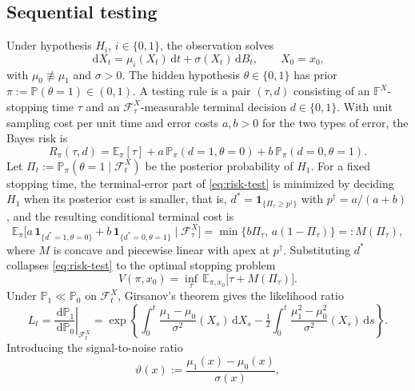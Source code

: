 \documentclass[pdflatex,sn-mathphys-num]{sn-jnl}
\theoremstyle{plain}
\theoremstyle{definition}
\newcommand{\E}{\mathbb{E}}
\newcommand{\PR}{\mathbb{P}}
\newcommand{\Filt}{\mathbb{F}}
\newcommand{\Fx}{\mathcal{F}}
\newcommand{\ind}{\mathbf{1}}
\newcommand{\dd}{\,\mathrm{d}}
\newcommand{\snr}{\vartheta}
\newcommand{\post}{\Pi}
\begin{document}
\subsection{Sequential testing}\label{sec:test}
Under hypothesis $H_i$, $i\in\{0,1\}$, the observation solves
\begin{equation}\label{eq:Xdyn}
  \dd X_t=\mu_i(X_t)\dd t+\sigma(X_t)\dd B_t,\qquad X_0=x_0,
\end{equation}
with $\mu_0\not\equiv\mu_1$ and $\sigma>0$. The hidden hypothesis
$\theta\in\{0,1\}$ has prior $\pi:=\PR(\theta=1)\in(0,1)$. A testing rule is a
pair $(\tau,d)$ consisting of an $\Filt^X$-stopping time $\tau$ and an
$\Fx^X_\tau$-measurable terminal decision $d\in\{0,1\}$. With unit sampling cost
per unit time and error costs $a,b>0$ for the two types of error, the Bayes risk
is
\begin{equation}\label{eq:risk-test}
  R_\pi(\tau,d)=\E_\pi[\tau]
   +a\,\PR_\pi(d=1,\theta=0)+b\,\PR_\pi(d=0,\theta=1).
\end{equation}
Let $\post_t:=\PR_\pi(\theta=1\mid\Fx^X_t)$ be the posterior probability of $H_1$.
For a fixed stopping time, the terminal-error part of \eqref{eq:risk-test} is
minimized by deciding $H_1$ when its posterior cost is smaller, that is,
$d^\ast=\ind_{\{\post_\tau\ge p^\dagger\}}$ with $p^\dagger=a/(a+b)$, and the
resulting conditional terminal cost is
\begin{equation}\label{eq:Mdef}
  \E_\pi\!\big[a\,\ind_{\{d^\ast=1,\theta=0\}}+b\,\ind_{\{d^\ast=0,\theta=1\}}\mid\Fx^X_\tau\big]
   =\min\{b\post_\tau,\,a(1-\post_\tau)\}=:M(\post_\tau),
\end{equation}
where $M$ is concave and piecewise linear with apex at $p^\dagger$. Substituting
$d^\ast$ collapses \eqref{eq:risk-test} to the optimal stopping problem
\begin{equation}\label{eq:value-test}
  V(\pi,x_0)=\inf_\tau\,\E_{\pi,x_0}\big[\tau+M(\post_\tau)\big].
\end{equation}
Under $\PR_1\ll\PR_0$ on $\Fx^X_t$, Girsanov's theorem gives the likelihood ratio
\begin{equation}\label{eq:LR}
  L_t=\left.\frac{\dd\PR_1}{\dd\PR_0}\right|_{\Fx^X_t}
   =\exp\!\left\{\int_0^t\frac{\mu_1-\mu_0}{\sigma^2}(X_s)\dd X_s
   -\tfrac12\int_0^t\frac{\mu_1^2-\mu_0^2}{\sigma^2}(X_s)\dd s\right\}.
\end{equation}
Introducing the signal-to-noise ratio
\begin{equation}\label{eq:snr}
  \snr(x):=\frac{\mu_1(x)-\mu_0(x)}{\sigma(x)},
\end{equation}
\end{document}
